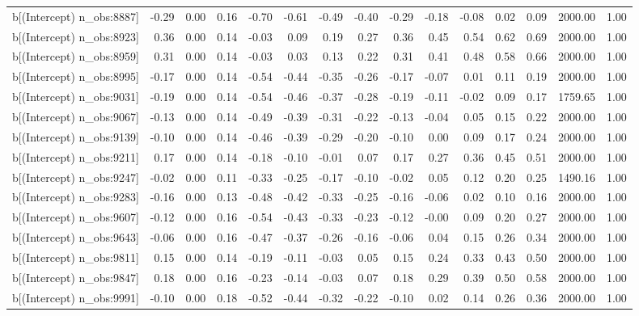 \begin{table}[ht]
\begin{tabular}{rrrrrrrrrrrrrrr}
  b[(Intercept) n\_obs:8887] & -0.29 & 0.00 & 0.16 & -0.70 & -0.61 & -0.49 & -0.40 & -0.29 & -0.18 & -0.08 & 0.02 & 0.09 & 2000.00 & 1.00 \\ 
  b[(Intercept) n\_obs:8923] & 0.36 & 0.00 & 0.14 & -0.03 & 0.09 & 0.19 & 0.27 & 0.36 & 0.45 & 0.54 & 0.62 & 0.69 & 2000.00 & 1.00 \\ 
  b[(Intercept) n\_obs:8959] & 0.31 & 0.00 & 0.14 & -0.03 & 0.03 & 0.13 & 0.22 & 0.31 & 0.41 & 0.48 & 0.58 & 0.66 & 2000.00 & 1.00 \\ 
  b[(Intercept) n\_obs:8995] & -0.17 & 0.00 & 0.14 & -0.54 & -0.44 & -0.35 & -0.26 & -0.17 & -0.07 & 0.01 & 0.11 & 0.19 & 2000.00 & 1.00 \\ 
  b[(Intercept) n\_obs:9031] & -0.19 & 0.00 & 0.14 & -0.54 & -0.46 & -0.37 & -0.28 & -0.19 & -0.11 & -0.02 & 0.09 & 0.17 & 1759.65 & 1.00 \\ 
  b[(Intercept) n\_obs:9067] & -0.13 & 0.00 & 0.14 & -0.49 & -0.39 & -0.31 & -0.22 & -0.13 & -0.04 & 0.05 & 0.15 & 0.22 & 2000.00 & 1.00 \\ 
  b[(Intercept) n\_obs:9139] & -0.10 & 0.00 & 0.14 & -0.46 & -0.39 & -0.29 & -0.20 & -0.10 & 0.00 & 0.09 & 0.17 & 0.24 & 2000.00 & 1.00 \\ 
  b[(Intercept) n\_obs:9211] & 0.17 & 0.00 & 0.14 & -0.18 & -0.10 & -0.01 & 0.07 & 0.17 & 0.27 & 0.36 & 0.45 & 0.51 & 2000.00 & 1.00 \\ 
  b[(Intercept) n\_obs:9247] & -0.02 & 0.00 & 0.11 & -0.33 & -0.25 & -0.17 & -0.10 & -0.02 & 0.05 & 0.12 & 0.20 & 0.25 & 1490.16 & 1.00 \\ 
  b[(Intercept) n\_obs:9283] & -0.16 & 0.00 & 0.13 & -0.48 & -0.42 & -0.33 & -0.25 & -0.16 & -0.06 & 0.02 & 0.10 & 0.16 & 2000.00 & 1.00 \\ 
  b[(Intercept) n\_obs:9607] & -0.12 & 0.00 & 0.16 & -0.54 & -0.43 & -0.33 & -0.23 & -0.12 & -0.00 & 0.09 & 0.20 & 0.27 & 2000.00 & 1.00 \\ 
  b[(Intercept) n\_obs:9643] & -0.06 & 0.00 & 0.16 & -0.47 & -0.37 & -0.26 & -0.16 & -0.06 & 0.04 & 0.15 & 0.26 & 0.34 & 2000.00 & 1.00 \\ 
  b[(Intercept) n\_obs:9811] & 0.15 & 0.00 & 0.14 & -0.19 & -0.11 & -0.03 & 0.05 & 0.15 & 0.24 & 0.33 & 0.43 & 0.50 & 2000.00 & 1.00 \\ 
  b[(Intercept) n\_obs:9847] & 0.18 & 0.00 & 0.16 & -0.23 & -0.14 & -0.03 & 0.07 & 0.18 & 0.29 & 0.39 & 0.50 & 0.58 & 2000.00 & 1.00 \\ 
  b[(Intercept) n\_obs:9991] & -0.10 & 0.00 & 0.18 & -0.52 & -0.44 & -0.32 & -0.22 & -0.10 & 0.02 & 0.14 & 0.26 & 0.36 & 2000.00 & 1.00 \\ 

\end{tabular}
\end{table}
